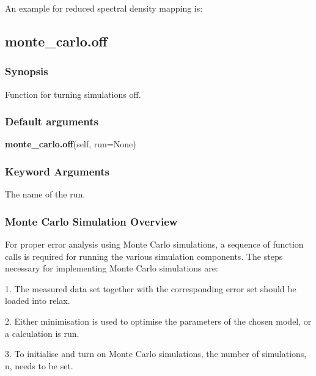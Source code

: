 
An example for reduced spectral density mapping is:





\newpage

\subsection{monte\_carlo.off}


\subsubsection{Synopsis}

Function for turning simulations off.

\subsubsection{Default arguments}

\textsf{\textbf{monte\_carlo.off}(self, run=None)}


\subsubsection{Keyword Arguments}

  The name of the run.

\subsubsection{Monte Carlo Simulation Overview}

For proper error analysis using Monte Carlo simulations, a sequence of function calls is
required for running the various simulation components.  The steps necessary for
implementing Monte Carlo simulations are:

1.  The measured data set together with the corresponding error set should be loaded into
relax.

2.  Either minimisation is used to optimise the parameters of the chosen model, or a
calculation is run.

3.  To initialise and turn on Monte Carlo simulations, the number of simulations, n, needs
to be set.


